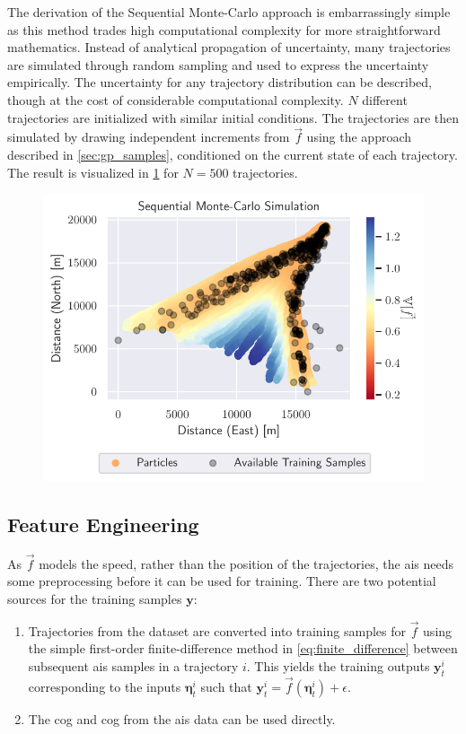 The derivation of the Sequential Monte-Carlo approach is embarrassingly simple as this method trades high computational complexity for more straightforward mathematics. Instead of analytical propagation of uncertainty, many trajectories are simulated through random sampling and used to express the uncertainty empirically. The uncertainty for any trajectory distribution can be described, though at the cost of considerable computational complexity.
$N$ different trajectories are initialized with similar initial conditions. The trajectories are then simulated by drawing independent increments from $\vec{f}$ using the approach described in \cref{sec:gp_samples}, conditioned on the current state of each trajectory. The result is visualized in \cref{fig:gp_particle} for $N=500$ trajectories.
\begin{figure}[h]
    \centering
    \includegraphics[width=\textwidth]{figures/dyngp/gp_particle.pdf}
    \caption{}
    \label{fig:gp_particle}
\end{figure}


\subsection{Feature Engineering}
As $\vec{f}$ models the speed, rather than the position of the trajectories, the \acrshort{ais} needs some preprocessing before it can be used for training. There are two potential sources for the training samples $\boldsymbol{y}$:

\begin{enumerate}
    \item Trajectories from the dataset are converted into training samples for $\vec{f}$ using the simple first-order finite-difference method in \cref{eq:finite_difference} between subsequent \acrshort{ais} samples in a trajectory $i$. This yields the training outputs $\boldsymbol{y}_t^{i}$ corresponding to the inputs $\boldsymbol{\eta}_t^i$ such that $\boldsymbol{y}_t^i = \vec{f}(\boldsymbol{\eta}_t^i) + \epsilon$.
    \item The \acrshort{cog} and \acrshort{cog} from the \acrshort{ais} data can be used directly.
\end{enumerate}

